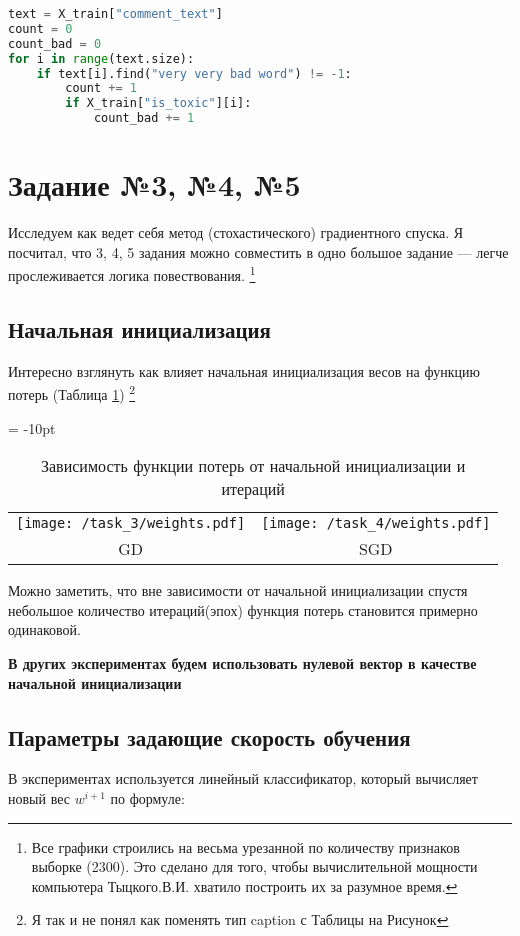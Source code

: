 \documentclass[12pt,fleqn]{article}
\begin{document}
\begin{lstlisting}[language=Python, caption=Count bad words, label=code:count_bad]
text = X_train["comment_text"]
count = 0
count_bad = 0
for i in range(text.size):
    if text[i].find("very very bad word") != -1:
        count += 1
        if X_train["is_toxic"][i]:
            count_bad += 1
\end{lstlisting}

\section{Задание №3, №4, №5}
Исследуем как ведет себя метод (стохастического) градиентного спуска. 
Я посчитал, что 3, 4, 5 задания можно совместить в одно большое задание --- легче прослеживается
логика повествования.
\footnote{Все графики строились на весьма урезанной по количеству признаков выборке (2300).
 Это сделано для того, чтобы вычислительной мощности компьютера Тыцкого.В.И. хватило построить
 их за разумное время.}

\subsection{Начальная инициализация}
Интересно взглянуть как влияет начальная инициализация весов на функцию потерь (Таблица \ref{pic:weights})
\footnote{Я так и не понял как поменять тип caption с Таблицы на Рисунок}

\newpage

\begin{table}[htb]
    \centering
    \tabcolsep = -10pt
    \begin{tabular}{cc}
        \texttt{[image: /task\_3/weights.pdf]}  & \texttt{[image: /task\_4/weights.pdf]} \\
        GD & SGD
    \end{tabular}
    \caption{Зависимость функции потерь от начальной инициализации и итераций}
    \label{pic:weights}
\end{table}

Можно заметить, что вне зависимости от начальной инициализации спустя небольшое
количество итераций(эпох) функция потерь становится примерно одинаковой.

\textbf{В других экспериментах будем использовать нулевой вектор в качестве начальной инициализации}
\subsection{Параметры задающие скорость обучения}
В экспериментах используется линейный классификатор, который вычисляет новый вес $w^{i+1}$ 
по формуле:
\end{document}
